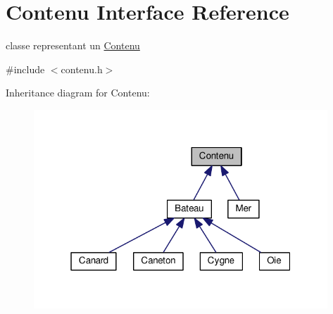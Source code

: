 \hypertarget{classContenu}{\section{Contenu Interface Reference}
\label{classContenu}
}


classe representant un \hyperlink{classContenu}{Contenu}  




{\ttfamily \#include $<$contenu.\+h$>$}



Inheritance diagram for Contenu\+:
\nopagebreak
\begin{figure}[H]
\begin{center}
\leavevmode
\includegraphics[width=313pt]{classContenu__inherit__graph}
\end{center}
\end{figure}
